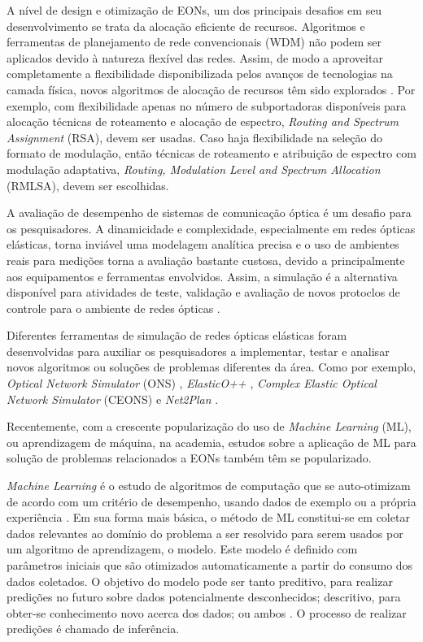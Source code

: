A nível de design e otimização de EONs, um dos principais desafios em seu desenvolvimento se trata da alocação eficiente de recursos. Algoritmos e ferramentas de planejamento de rede convencionais (WDM) não podem ser aplicados devido à natureza flexível das redes. Assim, de modo a aproveitar completamente a flexibilidade disponibilizada pelos avanços de tecnologias na camada física, novos algoritmos de alocação de recursos têm sido explorados \cite{eon_tutorial_2014, eon_allocation_2011, eon_allocation_2011_2, eon_allocation_2016, eon_allocation_2017}. Por exemplo, com flexibilidade apenas no número de subportadoras disponíveis para alocação técnicas de roteamento e alocação de espectro, \textit{Routing and Spectrum Assignment} (RSA), devem ser usadas. Caso haja flexibilidade na seleção do formato de modulação, então técnicas de roteamento e atribuição de espectro com modulação adaptativa, \textit{Routing, Modulation Level and Spectrum Allocation} (RMLSA), devem ser escolhidas.

A avaliação de desempenho de sistemas de comunicação óptica é um desafio para os pesquisadores. A dinamicidade e complexidade, especialmente em redes ópticas elásticas, torna inviável uma modelagem analítica precisa e o uso de ambientes reais para medições torna a avaliação bastante custosa, devido a principalmente aos equipamentos e ferramentas envolvidos. Assim, a simulação é a alternativa disponível para atividades de teste, validação e avaliação de novos protoclos de controle para o ambiente de redes ópticas \cite{costa2016ons}.

Diferentes ferramentas de simulação de redes ópticas elásticas foram desenvolvidas para auxiliar os pesquisadores a implementar, testar e analisar novos algoritmos ou soluções de problemas diferentes da área. Como por exemplo, \textit{Optical Network Simulator} (ONS) \cite{costa2016ons}, \textit{ElasticO++} \cite{TESSINARI201695}, \textit{Complex Elastic Optical Network Simulator} (CEONS) \cite{ceons2015} e \textit{Net2Plan} \cite{net2plan}.

Recentemente, com a crescente popularização do uso de \textit{Machine Learning} (ML), ou aprendizagem de máquina, na academia, estudos sobre a aplicação de ML para solução de problemas relacionados a EONs também têm se popularizado.

\textit{Machine Learning} é o estudo de algoritmos de computação que se auto-otimizam de acordo com um critério de desempenho, usando dados de exemplo ou a própria experiência \cite{mitchell1997ml, alpaydin2020introduction}. Em sua forma mais básica, o método de ML constitui-se em coletar dados relevantes ao domínio do problema a ser resolvido para serem usados por um algoritmo de aprendizagem, o modelo. Este modelo é definido com parâmetros iniciais que são otimizados automaticamente a partir do consumo dos dados coletados. O objetivo do modelo pode ser tanto preditivo, para realizar predições no futuro sobre dados potencialmente desconhecidos; descritivo, para obter-se conhecimento novo acerca dos dados; ou ambos \cite{alpaydin2020introduction, brief_introduction_to_ml}. O processo de realizar predições é chamado de inferência.

